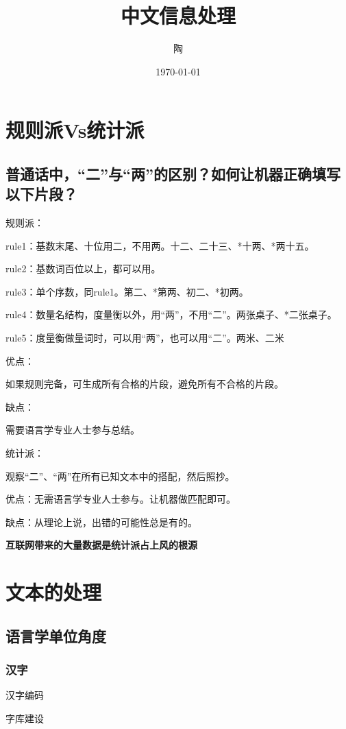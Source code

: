 \documentclass{ctexart}
\title{中文信息处理}
\author{陶}
\date{\today}
\begin{document}
\maketitle
\tableofcontents

\section{规则派Vs统计派}
\label{sec:first}
\subsection{
    普通话中，“二”与“两”的区别？如何让机器正确填写以下片段？
}
规则派：

rule1：基数末尾、十位用二，不用两。十二、二十三、*十两、*两十五。

rule2：基数词百位以上，都可以用。

rule3：单个序数，同rule1。第二、*第两、初二、*初两。

rule4：数量名结构，度量衡以外，用“两”，不用“二”。两张桌子、*二张桌子。

rule5：度量衡做量词时，可以用“两”，也可以用“二”。两米、二米

优点：

如果规则完备，可生成所有合格的片段，避免所有不合格的片段。

缺点：

需要语言学专业人士参与总结。

统计派：

观察“二”、“两”在所有已知文本中的搭配，然后照抄。

优点：无需语言学专业人士参与。让机器做匹配即可。

缺点：从理论上说，出错的可能性总是有的。

\vspace{\baselineskip}

\textbf{互联网带来的大量数据是统计派占上风的根源}

\section{文本的处理}
\subsection{语言学单位角度}
\subsubsection{汉字}
汉字编码

字库建设
\end{document}

